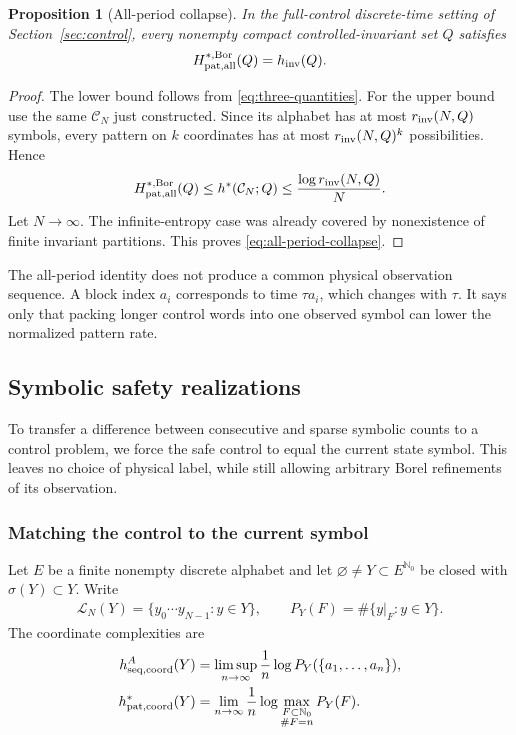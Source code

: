 \documentclass[11pt,reqno]{amsart}
\numberwithin{equation}{section}
\newtheorem{proposition}[theorem]{Proposition}
\theoremstyle{definition}
\theoremstyle{definition}
\newcommand{\Nzero}{\mathbb N_0}
\newcommand{\C}{\mathcal C}
\newcommand{\Lcal}{\mathcal L}
\newcommand{\hpat}{h^{*}}
\newcommand{\hinv}{h_{\mathrm{inv}}}
\newcommand{\Bor}{\mathrm{Bor}}
\begin{document}
\begin{proposition}[All-period collapse]\label{prop:all-period-collapse}
In the full-control discrete-time setting of Section~\ref{sec:control}, every
nonempty compact controlled-invariant set $Q$ satisfies
\begin{equation}\label{eq:all-period-collapse}
 H_{\rm pat,all}^{*,\Bor}(Q)=\hinv(Q).
\end{equation}
\end{proposition}

\begin{proof}
The lower bound follows from
\eqref{eq:three-quantities}. For the upper bound use the same
$\C_N$ just constructed. Since its alphabet has at most
$r_{\rm inv}(N,Q)$ symbols, every pattern on $k$ coordinates has at most
$r_{\rm inv}(N,Q)^k$ possibilities. Hence
\begin{align*}
 H_{\rm pat,all}^{*,\Bor}(Q)
 \le\hpat(\C_N;Q)
 \le\frac{\log r_{\rm inv}(N,Q)}{N}.
\end{align*}
Let $N\to\infty$. The infinite-entropy case was already covered by
nonexistence of finite invariant partitions. This proves
\eqref{eq:all-period-collapse}.
\end{proof}

The all-period identity does not produce a common physical observation
sequence. A block index $a_i$ corresponds to time $\tau a_i$, which
changes with $\tau$. It says only that packing longer control words
into one observed symbol can lower the normalized pattern rate.

\subsection{Symbolic safety realizations}\label{sec:realization}

To transfer a difference between consecutive and sparse symbolic
counts to a control problem, we force the safe control to equal the
current state symbol. This leaves no choice of physical label, while
still allowing arbitrary Borel refinements of its observation.

\subsubsection{Matching the control to the current symbol}

Let $E$ be a finite nonempty discrete alphabet and let
$\varnothing\ne Y\subset E^{\Nzero}$ be closed with $\sigma(Y)\subset Y$.
Write
\begin{align*}
 \Lcal_N(Y)=\{y_0\cdots y_{N-1}:y\in Y\},
 \qquad
 P_Y(F)=\#\{y|_F:y\in Y\}.
\end{align*}
The coordinate complexities are
\begin{align*}
 h_{\rm seq,coord}^A(Y)
 &=\limsup_{n\to\infty}\frac1n
   \log P_Y(\{a_1,\ldots,a_n\}),\\
 h_{\rm pat,coord}^*(Y)
 &=\lim_{n\to\infty}\frac1n
   \log\max_{\substack{F\subset\Nzero\\\#F=n}}P_Y(F).
\end{align*}
\end{document}
